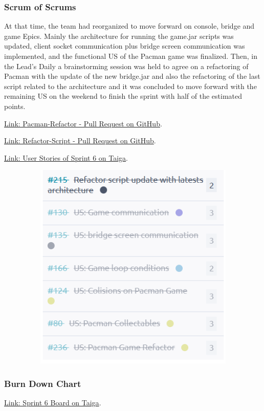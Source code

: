\hypertarget{sos-s3} {
\subsubsection{Scrum of Scrums}\label{Scrum of Scrums} 
At that time, the team had reorganized to move forward on console, bridge and game Epics.
Mainly the architecture for running the game.jar scripts was updated, client socket communication plus bridge screen communication was implemented, and the functional US of the Pacman game was finalized. Then, in the Lead's Daily a brainstorming session was held to agree on a refactoring of Pacman with the update of the new bridge.jar and also the refactoring of the last script related to the architecture and it was concluded to move forward with the remaining US on the weekend to finish the sprint with half of the estimated points.
}

\href{https://github.com/Pending-Name-21/pac-man/pull/10}{Link: Pacman-Refactor - Pull Request on GitHub}.

\href{https://github.com/Pending-Name-21/miscellany/pull/17}{Link: Refactor-Script - Pull Request on GitHub}.

\href{https://tree.taiga.io/project/joseluis-teran-coffeetime/taskboard/sprint-6-3003}{Link: User Stories of Sprint 6 on Taiga}.

\begin{figure}
\centering
\includegraphics[width=16cm, height=10cm]{./artifacts/src/sprint-6/assets/US-Sprint6.png}
\end{figure}

\hypertarget{burndownchart-s3}{
\subsubsection{Burn Down Chart}\label{Burn Down Chart S3}}
\href{https://tree.taiga.io/project/joseluis-teran-coffeetime/taskboard/sprint-6-3003}{Link: Sprint 6 Board on Taiga}.

